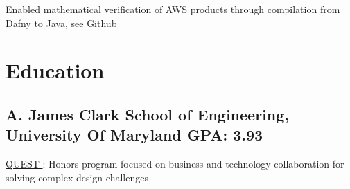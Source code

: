 \documentclass[print]{jack-resume}
\begin{document}
\begin{tightemize}
    \item Enabled mathematical verification of AWS products through compilation from Dafny to Java, see \href{https://github.com/dafny-lang/dafny}{Github \ExternalLink}
\end{tightemize}
\sectionsep

\section{Education}
\subsection{A. James Clark School of Engineering, University Of Maryland \hfill GPA: 3.93}
 \hfill
\begin{tightemize}
    \item \color{darkmodePrimary}\href{https://www.rhsmith.umd.edu/programs/undergraduate-programs/academics/fellows-special-programs/quest}{QUEST \ExternalLink}: Honors program focused on business and technology collaboration for solving complex design challenges
\end{tightemize}

\begin{minipage}[t]{0.04\textwidth}
    \hfill
\end{minipage}
\end{document}

